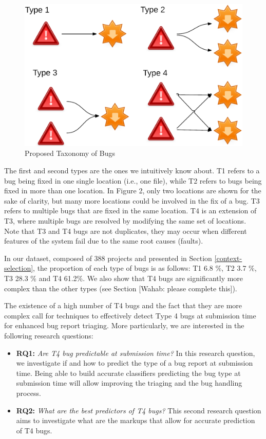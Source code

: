 \documentclass[12pt]{report}
\providecommand{\tightlist}{%
  \setlength{\itemsep}{0pt}\setlength{\parskip}{0pt}}
\begin{document}
\begin{figure}[h!]
  \centering
    \includegraphics[scale=0.6]{media/chap9/bug-taxo.png}
    \caption{Proposed Taxonomy of Bugs
    \label{fig:bug-taxo}}
\end{figure}

The first and second types are the ones we intuitively know about. T1
refers to a bug being fixed in one single location (i.e., one file),
while T2 refers to bugs being fixed in more than one location. In Figure
2, only two locations are shown for the sake of clarity, but many more
locations could be involved in the fix of a bug. T3 refers to multiple
bugs that are fixed in the same location. T4 is an extension of T3,
where multiple bugs are resolved by modifying the same set of locations.
Note that T3 and T4 bugs are not duplicates, they may occur when
different features of the system fail due to the same root causes
(faults).

In our dataset, composed of 388 projects and presented in Section
\ref{context-selection}, the proportion of each type of bugs is as
follows: T1 6.8 \%, T2 3.7 \%, T3 28.3 \% and T4 61.2\%. We also show that T4  bugs are significantly more complex than the other types (see Section [Wahab: please complete this]).

The existence of a high number of T4 bugs and the fact that they are
more complex call for techniques to effectively detect Type 4 bugs at submission time for enhanced bug report triaging. More particularly, we are
interested in the following research questions:

\begin{itemize}
\tightlist
\item
  \textbf{RQ1:} \emph{Are T4 bug predictable at submission time?} In
  this research question, we investigate if and how to predict the type
  of a bug report at submission time. Being able to build accurate
  classifiers predicting the bug type at submission time will allow
  improving the triaging and the bug handling process.
\item
  \textbf{RQ2:} \emph{What are the best predictors of T4 bugs?}
  This second research question aims to investigate what are the markups
  that allow for accurate prediction of T4 bugs.
\end{itemize}
\end{document}
